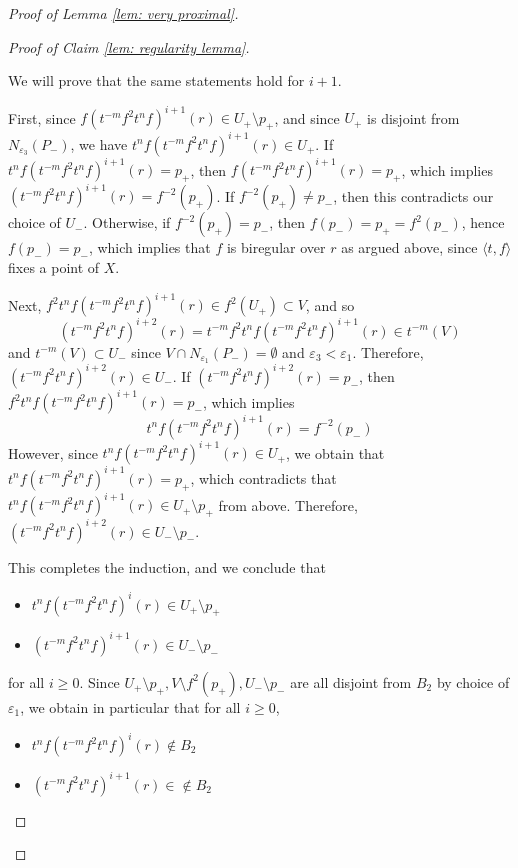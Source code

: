 \documentclass[12pt]{article}
\theoremstyle{definition}
\newcommand{\ve}{\varepsilon}
\begin{document}
\begin{proof} [Proof of Lemma \ref{lem: very proximal}]
\begin{proof}[Proof of Claim \ref{lem: regularity lemma}]
\begin{enumerate}
\begin{enumerate}
\begin{enumerate}
    We will prove that the same statements hold for $i+1$. 

    First, since $f(t^{-m}f^2 t^n f)^{i+1}(r) \in U_+ \setminus p_+$, and since $U_+$ is disjoint from $N_{\ve_3}(P_-)$, we have $t^nf(t^{-m}f^2 t^n f)^{i+1}(r) \in U_+$. If $t^nf(t^{-m}f^2 t^n f)^{i+1}(r) = p_+$, then \newline $f(t^{-m}f^2 t^n f)^{i+1}(r) = p_+$, which implies $(t^{-m}f^2 t^n f)^{i+1}(r) = f^{-2}(p_+)$. If $f^{-2}(p_+) \neq p_-$, then this contradicts our choice of $U_-$. Otherwise, if $f^{-2}(p_+) = p_-$, then $f(p_-) = p_+ = f^2(p_-)$, hence $f(p_-) = p_-$, which implies that $f$ is biregular over $r$ as argued above, since $\langle t, f \rangle$ fixes a point of $X$. 

    Next, $f^2t^nf(t^{-m}f^2 t^n f)^{i+1}(r) \in f^2(U_+) \subset V$, and so 
    $$(t^{-m}f^2 t^n f)^{i+2}(r) = t^{-m}f^2t^nf(t^{-m}f^2 t^n f)^{i+1}(r) \in t^{-m}(V)$$ and $t^{-m}(V) \subset U_-$ since $V \cap N_{\ve_1}(P_-) = \emptyset$ and $\ve_3 < \ve_1$. Therefore, $(t^{-m}f^2 t^n f)^{i+2}(r) \in U_-$. If $(t^{-m}f^2 t^n f)^{i+2}(r) = p_-$, then $f^2t^nf(t^{-m}f^2 t^n f)^{i+1}(r) = p_-$, which implies $$t^nf(t^{-m}f^2 t^n f)^{i+1}(r) = f^{-2}(p_-)$$ However, since $t^nf(t^{-m}f^2 t^n f)^{i+1}(r) \in U_+$, we obtain that $t^nf(t^{-m}f^2 t^n f)^{i+1}(r) = p_+$, which contradicts that $t^nf(t^{-m}f^2 t^n f)^{i+1}(r) \in U_+ \setminus p_+$ from above. Therefore, $(t^{-m}f^2 t^n f)^{i+2}(r) \in U_- \setminus p_-$. 

    

    This completes the induction, and we conclude that 

    \begin{itemize}
        \item $t^n f(t^{-m}f^2 t^n f)^i(r) \in U_+ \setminus p_+$
        \item $(t^{-m}f^2 t^n f)^{i+1}(r) \in U_- \setminus p_-$
    \end{itemize}

    for all $i \geq 0$. Since $U_+ \setminus p_+, V \setminus f^2(p_+), U_- \setminus p_-$ are all disjoint from $B_2$ by choice of $\ve_1$, we obtain in particular that for all $i \geq 0$,

    \begin{itemize}
        \item $t^n f(t^{-m}f^2 t^n f)^i(r) \notin B_2$
        \item $(t^{-m}f^2 t^n f)^{i+1}(r) \in \notin B_2$
    \end{itemize}


\end{enumerate}
\end{enumerate}
\end{enumerate}
\end{proof}
\end{proof}
\end{document}
